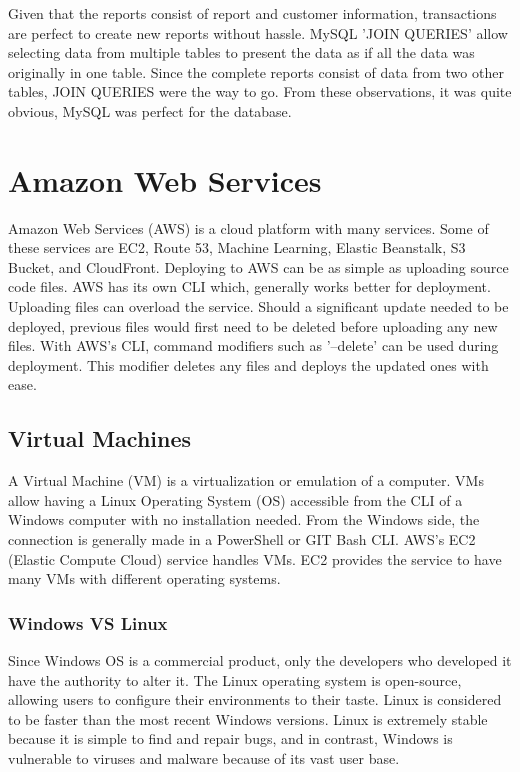 Given that the reports consist of report and customer information, transactions are perfect to create new reports without hassle. MySQL 'JOIN QUERIES' allow selecting data from multiple tables to present the data as if all the data was originally in one table. Since the complete reports consist of data from two other tables, JOIN QUERIES were the way to go. From these observations, it was quite obvious, MySQL was perfect for the database. 

\section{Amazon Web Services}
Amazon Web Services (AWS) is a cloud platform with many services. Some of these services are EC2, Route 53, Machine Learning, Elastic Beanstalk, S3 Bucket, and CloudFront. Deploying to AWS can be as simple as uploading source code files. AWS has its own CLI which, generally works better for deployment. Uploading files can overload the service. Should a significant update needed to be deployed, previous files would first need to be deleted before uploading any new files. With AWS's CLI, command modifiers such as '--delete' can be used during deployment. This modifier deletes any files and deploys the updated ones with ease.

\subsection{Virtual Machines}
A Virtual Machine (VM) is a virtualization or emulation of a computer. VMs allow having a Linux Operating System (OS) accessible from the CLI of a Windows computer with no installation needed. From the Windows side, the connection is generally made in a PowerShell or GIT Bash CLI. AWS's EC2 (Elastic Compute Cloud) service handles VMs. EC2 provides the service to have many VMs with different operating systems.

\subsubsection{Windows VS Linux}
Since Windows OS is a commercial product, only the developers who developed it have the authority to alter it. The Linux operating system is open-source, allowing users to configure their environments to their taste. Linux is considered to be faster than the most recent Windows versions. Linux is extremely stable because it is simple to find and repair bugs, and in contrast, Windows is vulnerable to viruses and malware because of its vast user base. \cite{ref13}

